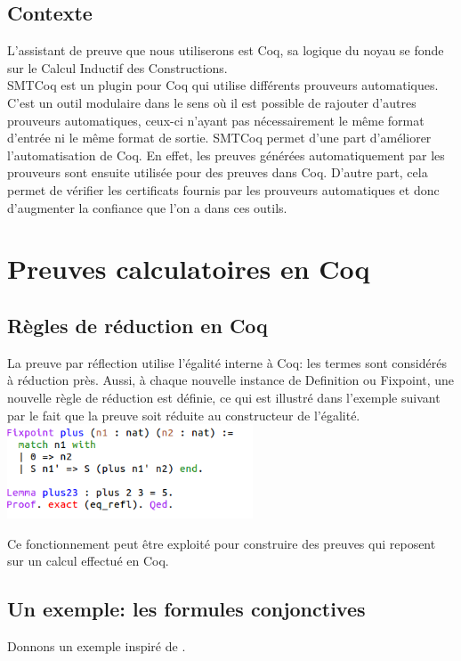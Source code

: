 \documentclass{article}
\begin{document}
\subsection{Contexte}

L'assistant de preuve que nous utiliserons est Coq, sa logique du noyau se fonde sur le Calcul Inductif des Constructions. \\

SMTCoq est un plugin pour Coq qui utilise différents prouveurs automatiques. C'est un outil modulaire dans le sens où il est possible de rajouter d'autres prouveurs automatiques, ceux-ci n'ayant pas nécessairement le même format d'entrée ni le même format de sortie. SMTCoq permet d'une part d'améliorer l'automatisation de Coq. En effet, les preuves générées automatiquement par les prouveurs sont ensuite utilisée pour des preuves dans Coq. D'autre part, cela permet de vérifier les certificats fournis par les prouveurs automatiques et donc d'augmenter la confiance que l'on a dans ces outils.



\section{Preuves calculatoires en Coq}

\subsection{Règles de réduction en Coq}

La preuve par réflection utilise l'égalité interne à Coq: les termes sont considérés à réduction près. 
Aussi, à chaque nouvelle instance de Definition ou Fixpoint, une nouvelle règle de réduction est définie, ce qui est illustré dans l'exemple suivant par le fait que la preuve soit réduite au constructeur de l'égalité.\\

\includegraphics[height = 2.8cm]{refl.png}

Ce fonctionnement peut être exploité pour construire des preuves qui reposent sur un calcul effectué en Coq. 


\subsection{Un exemple: les formules conjonctives}
Donnons un exemple inspiré de \cite{coq_intro}.
\end{document}
